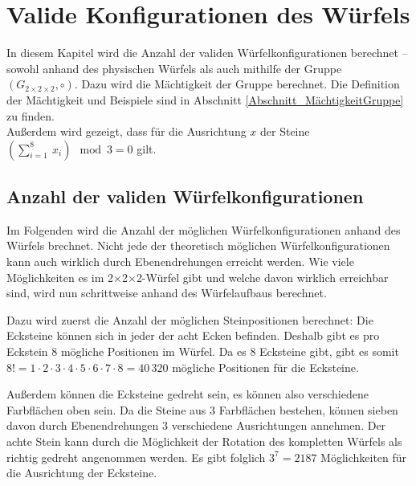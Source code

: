 \documentclass[12pt,a4paper, usenames, dvipsnames]{article}
\theoremstyle{mystyle}
\theoremstyle{definition}
\newcommand{\Gtwo}{\ensuremath{G_{2\times 2\times 2}}}
\newcommand{\Ttwo}{2$\times$2$\times$2-}
\begin{document}
%
%
%
%
%
%
%
%
%
%
%
%
%
%
%
%
%
\newpage

\section{Valide Konfigurationen des Würfels}

\label{Kapitel_ValideKonfigurationen}

In diesem Kapitel wird die Anzahl der validen Würfelkonfigurationen berechnet -- sowohl anhand des physischen Würfels als auch mithilfe der Gruppe $(\Gtwo,\circ)$. Dazu wird die Mächtigkeit der Gruppe berechnet. Die Definition der Mächtigkeit und Beispiele sind in Abschnitt \ref{Abschnitt_MächtigkeitGruppe} zu finden. \\
Außerdem wird gezeigt, dass für die Ausrichtung $x$ der Steine $( \sum_{i= 1}^{8} \ x_i ) \mod 3 = 0$ gilt.

%
%
%
%
%
%
%
%
%
%
%
%
%
%
%
%
%
%
%
\subsection{Anzahl der validen Würfelkonfigurationen}
\label{Abschnitt_AnzahlKonfigurationen}

Im Folgenden wird die Anzahl der möglichen Würfelkonfigurationen anhand des Würfels brechnet. Nicht jede der theoretisch möglichen Würfelkonfigurationen kann auch wirklich durch Ebenendrehungen erreicht werden. Wie viele Möglichkeiten es im \Ttwo Würfel gibt und welche davon wirklich erreichbar sind, wird nun schrittweise anhand des Würfelaufbaus berechnet. 

Dazu wird zuerst die Anzahl der möglichen Steinpositionen berechnet:
Die Ecksteine können sich in jeder der acht Ecken befinden. Deshalb gibt es pro Eckstein 8 mögliche Positionen im Würfel. Da es 8 Ecksteine gibt, gibt es somit $8! = 1 \cdot 2 \cdot 3 \cdot 4 \cdot 5 \cdot 6 \cdot 7 \cdot 8 = 40\, 320$ mögliche Positionen für die Ecksteine. 

Außerdem können die Ecksteine gedreht sein, es können also verschiedene Farbflächen oben sein. Da die Steine aus 3 Farbflächen bestehen, können sieben davon durch Ebenendrehungen 3 verschiedene Ausrichtungen annehmen. Der achte Stein kann durch die Möglichkeit der Rotation des kompletten Würfels als richtig gedreht angenommen werden. Es gibt folglich $3^7 = 2187$ Möglichkeiten für die Ausrichtung der Ecksteine.
\end{document}
